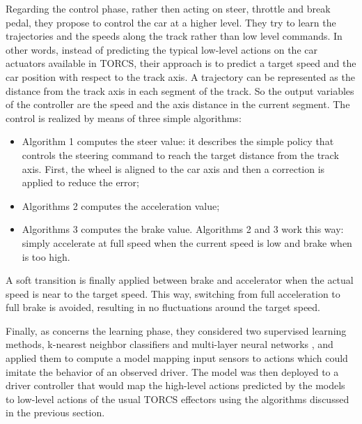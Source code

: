 Regarding the control phase, rather then acting on steer, throttle and break pedal, they propose  to control the car at a higher level. They try to learn the trajectories and the speeds along the track rather than low level commands.
In other words, instead of predicting the typical low-level actions on the car actuators available in TORCS, their approach is to predict a target speed and the car position with respect to the track axis.
A trajectory can be represented as the distance from the track axis in each segment of the track. So the output variables of the controller are the speed and the axis distance in the current segment.
The control is realized by means of three simple algorithms:
\begin{itemize}
\item Algorithm 1 computes the steer value: it describes the simple policy that controls the steering command to reach the target distance from the track axis. First, the wheel is aligned to the car axis and then a correction is applied to reduce the error;
\item Algorithms 2 computes the acceleration value;
\item Algorithms 3 computes the brake value. 
Algorithms 2 and 3 work this way: simply accelerate at full speed when the current speed is low and brake when is too high. 
\end{itemize}
A soft transition is finally applied between brake and accelerator when the actual speed is near to the target speed. This way, switching from full acceleration to full brake is avoided, resulting in no fluctuations around the target speed.

 
Finally, as concerns the learning phase, they considered two supervised learning methods, k-nearest neighbor classifiers \cite{knn} and multi-layer neural networks \cite{neat}, and applied them to compute a model mapping input sensors to actions which could imitate the behavior of an observed driver.
The model was then deployed to a driver controller that would map the high-level actions predicted by the models to low-level actions of the usual TORCS effectors
using the algorithms discussed in the previous section.

